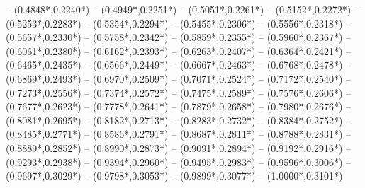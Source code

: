 {	-- ({0.4848*\dx},{0.2240*\dy}) %
	-- ({0.4949*\dx},{0.2251*\dy}) %
	-- ({0.5051*\dx},{0.2261*\dy}) %
	-- ({0.5152*\dx},{0.2272*\dy}) %
	-- ({0.5253*\dx},{0.2283*\dy}) %
	-- ({0.5354*\dx},{0.2294*\dy}) %
	-- ({0.5455*\dx},{0.2306*\dy}) %
	-- ({0.5556*\dx},{0.2318*\dy}) %
	-- ({0.5657*\dx},{0.2330*\dy}) %
	-- ({0.5758*\dx},{0.2342*\dy}) %
	-- ({0.5859*\dx},{0.2355*\dy}) %
	-- ({0.5960*\dx},{0.2367*\dy}) %
	-- ({0.6061*\dx},{0.2380*\dy}) %
	-- ({0.6162*\dx},{0.2393*\dy}) %
	-- ({0.6263*\dx},{0.2407*\dy}) %
	-- ({0.6364*\dx},{0.2421*\dy}) %
	-- ({0.6465*\dx},{0.2435*\dy}) %
	-- ({0.6566*\dx},{0.2449*\dy}) %
	-- ({0.6667*\dx},{0.2463*\dy}) %
	-- ({0.6768*\dx},{0.2478*\dy}) %
	-- ({0.6869*\dx},{0.2493*\dy}) %
	-- ({0.6970*\dx},{0.2509*\dy}) %
	-- ({0.7071*\dx},{0.2524*\dy}) %
	-- ({0.7172*\dx},{0.2540*\dy}) %
	-- ({0.7273*\dx},{0.2556*\dy}) %
	-- ({0.7374*\dx},{0.2572*\dy}) %
	-- ({0.7475*\dx},{0.2589*\dy}) %
	-- ({0.7576*\dx},{0.2606*\dy}) %
	-- ({0.7677*\dx},{0.2623*\dy}) %
	-- ({0.7778*\dx},{0.2641*\dy}) %
	-- ({0.7879*\dx},{0.2658*\dy}) %
	-- ({0.7980*\dx},{0.2676*\dy}) %
	-- ({0.8081*\dx},{0.2695*\dy}) %
	-- ({0.8182*\dx},{0.2713*\dy}) %
	-- ({0.8283*\dx},{0.2732*\dy}) %
	-- ({0.8384*\dx},{0.2752*\dy}) %
	-- ({0.8485*\dx},{0.2771*\dy}) %
	-- ({0.8586*\dx},{0.2791*\dy}) %
	-- ({0.8687*\dx},{0.2811*\dy}) %
	-- ({0.8788*\dx},{0.2831*\dy}) %
	-- ({0.8889*\dx},{0.2852*\dy}) %
	-- ({0.8990*\dx},{0.2873*\dy}) %
	-- ({0.9091*\dx},{0.2894*\dy}) %
	-- ({0.9192*\dx},{0.2916*\dy}) %
	-- ({0.9293*\dx},{0.2938*\dy}) %
	-- ({0.9394*\dx},{0.2960*\dy}) %
	-- ({0.9495*\dx},{0.2983*\dy}) %
	-- ({0.9596*\dx},{0.3006*\dy}) %
	-- ({0.9697*\dx},{0.3029*\dy}) %
	-- ({0.9798*\dx},{0.3053*\dy}) %
	-- ({0.9899*\dx},{0.3077*\dy}) %
	-- ({1.0000*\dx},{0.3101*\dy}) %
}
